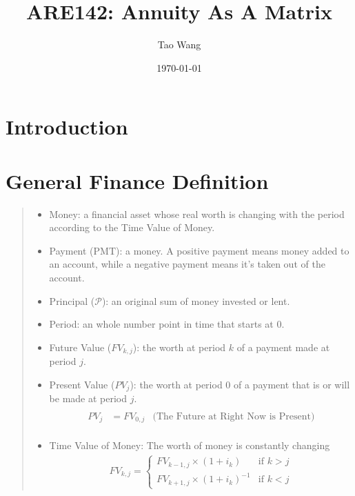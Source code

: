 \documentclass{article} %
\newcommand{\pmt}{\text{PMT}} %
\newcommand{\p}{\mathcal{P}} %
\begin{document}
\title{ARE142: Annuity As A Matrix}
\author{Tao Wang}
\date{\today}

\maketitle

\section{Introduction}
\begin{quote}

\end{quote}

\section{General Finance Definition}
\begin{quote}
    \begin{itemize}
        \item Money: a financial asset whose real worth is changing with the period according to the Time Value of Money.
        \item Payment ($\pmt$): a money. A positive payment means money added to an account, while a negative payment means it's taken out of the account.
        \item Principal ($\p$): an original sum of money invested or lent.
        \item Period: an whole number point in time that starts at 0.
        \item Future Value ($FV_{k, j}$): the worth at period $k$ of a payment made at period $j$.
        \item Present Value ($PV_j$): the worth at period 0 of a payment that is or will be made at period $j$.
              \begin{align*}
                  \\
                  PV_j & = FV_{0, j} & \text{(The Future at Right Now is Present)} \\
              \end{align*}
        \item Time Value of Money: The worth of money is constantly changing
              \begin{align*}
                  FV_{k,j} =
                  \begin{cases}
                      FV_{k-1,j} \times (1 + i_k)      & \text{if } k > j \\
                      FV_{k+1,j} \times (1 + i_k)^{-1} & \text{if } k < j
                  \end{cases}
              \end{align*}
    \end{itemize}
\end{quote}
\end{document}
